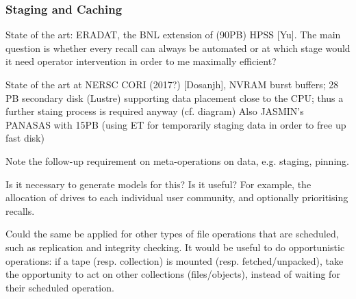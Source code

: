 \subsubsection{Staging and Caching}

State of the art: ERADAT, the BNL extension of (90PB) HPSS [Yu].  The main question is whether every recall can always
be automated or at which stage would it need operator intervention in order to me maximally efficient?

State of the art at NERSC CORI (2017?) [Dosanjh], NVRAM burst buffers; 28 PB secondary disk (Lustre) supporting data
placement close to the CPU; thus a further staing process is required anyway
(cf. diagram) Also JASMIN's PANASAS
with 15PB (using ET for temporarily staging data in order to free up fast disk)

Note the follow-up requirement on meta-operations on data, e.g. staging, pinning.


Is it necessary to generate models for this? Is it useful?  For example, the allocation of drives to each individual
user community, and optionally prioritising recalls.

Could the same be applied for other types of file operations that are scheduled, such as replication and integrity
checking.  It would be useful to do opportunistic operations: if a tape (resp. collection) is mounted
(resp. fetched/unpacked), take the opportunity to act on other collections (files/objects), instead of waiting for their
scheduled operation.
